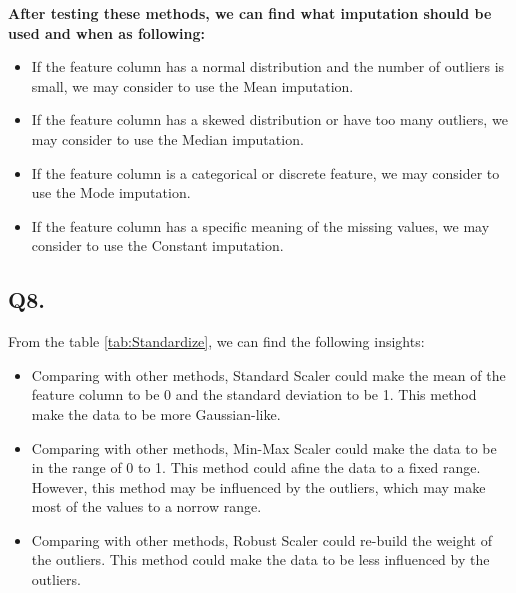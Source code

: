 \documentclass{article}
\begin{document}
\textbf{After testing these methods, we can find what imputation should be used and when as following:}

\begin{itemize}
    \item If the feature column has a normal distribution and the number of outliers is small, we may consider to use the Mean imputation.
    \item If the feature column has a skewed distribution or have too many outliers, we may consider to use the Median imputation.
    \item If the feature column is a categorical or discrete feature, we may consider to use the Mode imputation.
    \item If the feature column has a specific meaning of the missing values, we may consider to use the Constant imputation.
\end{itemize}

\subsection*{Q8.}

From the table \ref{tab:Standardize}, we can find the following insights:

\begin{itemize}
    \item Comparing with other methods, Standard Scaler could make the mean of the feature column to be 0 and the standard deviation to be 1. This method make the data to be more Gaussian-like.
    \item Comparing with other methods, Min-Max Scaler could make the data to be in the range of 0 to 1. This method could afine the data to a fixed range. However, this method may be influenced by the outliers, which may make most of the values to a norrow range.
    \item Comparing with other methods, Robust Scaler could re-build the weight of the outliers. This method could make the data to be less influenced by the outliers.
\end{itemize}
\end{document}
